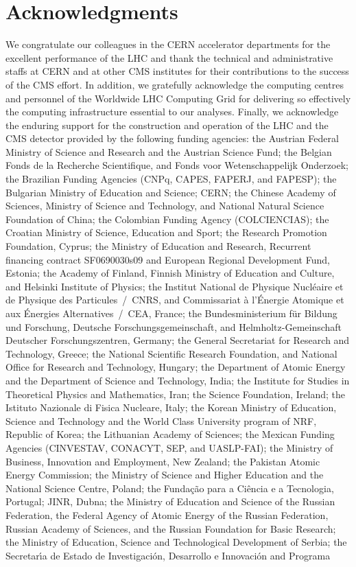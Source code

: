 \documentclass[11pt,twoside,a4paper,cmspaper,final,collab]{cms-tdr}
\begin{document}
\section*{Acknowledgments}

 We congratulate our colleagues in the CERN accelerator departments for the excellent performance of the LHC and thank the technical and administrative staffs at CERN and at other CMS institutes for their contributions to the success of the CMS effort. In addition, we gratefully acknowledge the computing centres and personnel of the Worldwide LHC Computing Grid for delivering so effectively the computing infrastructure essential to our analyses. Finally, we acknowledge the enduring support for the construction and operation of the LHC and the CMS detector provided by the following funding agencies: the Austrian Federal Ministry of Science and Research and the Austrian Science Fund; the Belgian Fonds de la Recherche Scientifique, and Fonds voor Wetenschappelijk Onderzoek; the Brazilian Funding Agencies (CNPq, CAPES, FAPERJ, and FAPESP); the Bulgarian Ministry of Education and Science; CERN; the Chinese Academy of Sciences, Ministry of Science and Technology, and National Natural Science Foundation of China; the Colombian Funding Agency (COLCIENCIAS); the Croatian Ministry of Science, Education and Sport; the Research Promotion Foundation, Cyprus; the Ministry of Education and Research, Recurrent financing contract SF0690030s09 and European Regional Development Fund, Estonia; the Academy of Finland, Finnish Ministry of Education and Culture, and Helsinki Institute of Physics; the Institut National de Physique Nucl\'eaire et de Physique des Particules~/~CNRS, and Commissariat \`a l'\'Energie Atomique et aux \'Energies Alternatives~/~CEA, France; the Bundesministerium f\"ur Bildung und Forschung, Deutsche Forschungsgemeinschaft, and Helmholtz-Gemeinschaft Deutscher Forschungszentren, Germany; the General Secretariat for Research and Technology, Greece; the National Scientific Research Foundation, and National Office for Research and Technology, Hungary; the Department of Atomic Energy and the Department of Science and Technology, India; the Institute for Studies in Theoretical Physics and Mathematics, Iran; the Science Foundation, Ireland; the Istituto Nazionale di Fisica Nucleare, Italy; the Korean Ministry of Education, Science and Technology and the World Class University program of NRF, Republic of Korea; the Lithuanian Academy of Sciences; the Mexican Funding Agencies (CINVESTAV, CONACYT, SEP, and UASLP-FAI); the Ministry of Business, Innovation and Employment, New Zealand; the Pakistan Atomic Energy Commission; the Ministry of Science and Higher Education and the National Science Centre, Poland; the Funda\c{c}\~ao para a Ci\^encia e a Tecnologia, Portugal; JINR, Dubna; the Ministry of Education and Science of the Russian Federation, the Federal Agency of Atomic Energy of the Russian Federation, Russian Academy of Sciences, and the Russian Foundation for Basic Research; the Ministry of Education, Science and Technological Development of Serbia; the Secretar\'{\i}a de Estado de Investigaci\'on, Desarrollo e Innovaci\'on and Programa 
\end{document}

